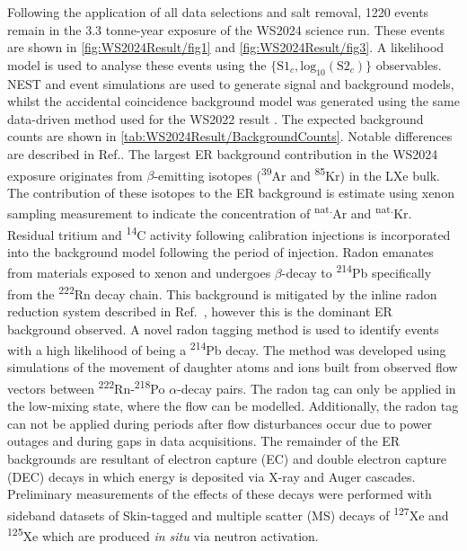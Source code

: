 Following the application of all data selections and salt removal, 1220 events remain in the 3.3 tonne-year exposure of the WS2024 science run. These events are shown in \autoref{fig:WS2024Result/fig1} and \autoref{fig:WS2024Result/fig3}. A likelihood model is used to analyse these events using the $\{\text{S1}_c,\text{log}_{10}(\text{S2}_c)\}$ observables. NEST and event simulations \cite{LZ_SIMS} are used to generate signal and background models, whilst the accidental coincidence background model was generated using the same data-driven method used for the WS2022 result \cite{LZ:2022lsv}. The expected background counts are shown in \autoref{tab:WS2024Result/BackgroundCounts}. Notable differences are described in Ref.\cite{LZCollaboration:2024lux}.
The largest ER background contribution in the WS2024 exposure originates from $\beta$-emitting isotopes (\textsuperscript{39}Ar and \textsuperscript{85}Kr) in the LXe bulk. The contribution of these isotopes to the ER background is estimate using xenon sampling measurement to indicate the concentration of \textsuperscript{nat.}Ar and \textsuperscript{nat.}Kr. Residual tritium and \textsuperscript{14}C activity following calibration injections is incorporated into the background model following the period of injection. Radon emanates from materials exposed to xenon and undergoes $\beta$-decay to \textsuperscript{214}Pb specifically from the \textsuperscript{222}Rn decay chain. This background is mitigated by the inline radon reduction system described in Ref.~\cite{marthurs:thesis}, however this is the dominant ER background observed. A novel radon tagging method is used to identify events with a high likelihood of being a \textsuperscript{214}Pb decay. The method was developed using simulations of the movement of daughter atoms and ions built from observed flow vectors between \textsuperscript{222}Rn-\textsuperscript{218}Po $\alpha$-decay pairs. The radon tag can only be applied in the low-mixing state, where the flow can be modelled. Additionally, the radon tag can not be applied during periods after flow disturbances occur due to power outages and during gaps in data acquisitions. The remainder of the ER backgrounds are resultant of electron capture (EC) and double electron capture (DEC) decays in which energy is deposited via X-ray and Auger cascades. Preliminary measurements of the effects of these decays were performed with sideband datasets of Skin-tagged and multiple scatter (MS) decays of \textsuperscript{127}Xe and \textsuperscript{125}Xe which are produced \textit{in situ} via neutron activation.

